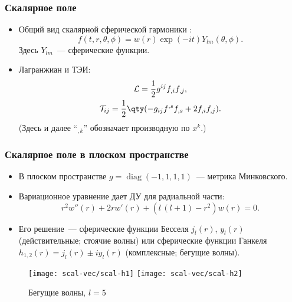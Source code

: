 \documentclass[compress, 9pt]{beamer}
\begin{document}
    \begin{frame}\frametitle{Скалярное поле}

        \begin{itemize}\justifying
            \item Общий вид скалярной сферической гармоники \cite{Vas2018a}:
            $$f(t,r,\theta,\phi) = w(r) \exp(-i t) Y_{lm}(\theta,\phi).$$
            Здесь $Y_{lm}$~--- сферические функции.
            \item Лагранжиан и ТЭИ: \begin{gather}
                \mathcal{L} = \frac{1}{2} g^{ij} f_{,i} f_{,j}, \\
                \mathcal{T}_{ij} = \frac{1}{2} \qty(- g_{ij} f^{,s} f_{,s} + 2 f_{,i} f_{,j}).
            \end{gather}
            (Здесь и далее \enquote{${}_{,k}$} обозначает производную по $x^k$.)
        \end{itemize}

    \end{frame}

    \begin{frame}\frametitle{Скалярное поле в плоском пространстве}

        \begin{itemize}\justifying
            \item В плоском пространстве $g = \mathop{\mathrm{diag}}(-1, 1, 1, 1)$~--- метрика Минковского.
            \item Вариационное уравнение дает ДУ для радиальной части:
            \begin{equation*}
                r^2 w''(r) + 2 r w'(r) + (l\,(l+1) - r^2) w(r) = 0.
            \end{equation*}
            \item Его решение~--- сферические функции Бесселя $j_l(r)$, $y_l(r)$ (действительные; стоячие волны) или сферические функции Ганкеля $h_{1,2}(r) = j_l(r) \pm i y_l(r)$ (комплексные; бегущие волны).
        \end{itemize}
        \begin{figure}[h]
            \centering
            \texttt{[image: scal-vec/scal-h1]}\hspace{8pt}%
            \texttt{[image: scal-vec/scal-h2]}\hspace{8pt}%
            \caption[]{Бегущие волны, $l = 5$}%
        \end{figure}

    \end{frame}
\end{document}
